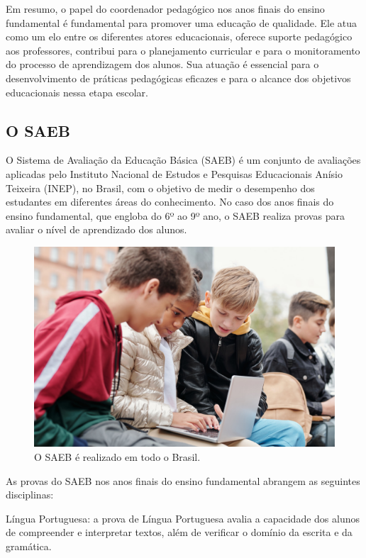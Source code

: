 Em resumo, o papel do coordenador pedagógico nos anos finais do ensino fundamental é fundamental para promover uma educação de qualidade. Ele atua como um elo entre os diferentes atores educacionais, oferece suporte pedagógico aos professores, contribui para o planejamento curricular e para o monitoramento do processo de aprendizagem dos alunos. Sua atuação é essencial para o desenvolvimento de práticas pedagógicas eficazes e para o alcance dos objetivos educacionais nessa etapa escolar.

\subsection{O SAEB}\label{o-saeb}

O Sistema de Avaliação da Educação Básica (SAEB) é um conjunto de avaliações aplicadas pelo Instituto Nacional de Estudos e Pesquisas Educacionais Anísio Teixeira (INEP), no Brasil, com o objetivo de medir o desempenho dos estudantes em diferentes áreas do conhecimento. No caso dos anos finais do ensino fundamental, que engloba do 6º ao 9º ano, o SAEB realiza provas para avaliar o nível de aprendizado dos alunos.

\begin{figure}[t]
\centering
\includegraphics[width=\textwidth]{./imgs/Imagem002.jpg}
\caption{O SAEB é realizado em todo o Brasil.}
\end{figure}

As provas do SAEB nos anos finais do ensino fundamental abrangem as seguintes disciplinas:

Língua Portuguesa: a prova de Língua Portuguesa avalia a capacidade dos alunos de compreender e interpretar textos, além de verificar o domínio da escrita e da gramática.

